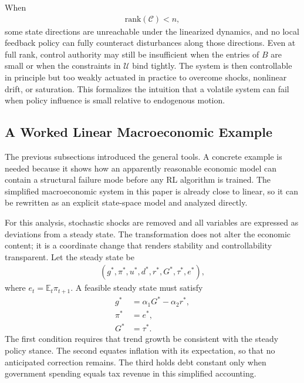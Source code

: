 \documentclass[11pt]{article}
\begin{document}
When
\begin{align}
    \mathrm{rank}(\mathcal{C}) < n,
\end{align}
some state directions are unreachable under the linearized dynamics, and no local feedback policy can fully counteract disturbances along those directions. Even at full rank, control authority may still be insufficient when the entries of $B$ are small or when the constraints in $\mathcal{U}$ bind tightly. The system is then controllable in principle but too weakly actuated in practice to overcome shocks, nonlinear drift, or saturation. This formalizes the intuition that a volatile system can fail when policy influence is small relative to endogenous motion.

\subsection{A Worked Linear Macroeconomic Example}
The previous subsections introduced the general tools. A concrete example is needed because it shows how an apparently reasonable economic model can contain a structural failure mode before any RL algorithm is trained. The simplified macroeconomic system in this paper is already close to linear, so it can be rewritten as an explicit state-space model and analyzed directly.

For this analysis, stochastic shocks are removed and all variables are expressed as deviations from a steady state. The transformation does not alter the economic content; it is a coordinate change that renders stability and controllability transparent. Let the steady state be
\begin{align*}
    (g^*,\pi^*,u^*,d^*,r^*,G^*,\tau^*,e^*),
\end{align*}
where $e_t=\mathbb{E}_t\pi_{t+1}$. A feasible steady state must satisfy
\begin{align*}
    g^* &= \alpha_1G^*-\alpha_2r^*, \\
    \pi^* &= e^*, \\
    G^* &= \tau^*.
\end{align*}
The first condition requires that trend growth be consistent with the steady policy stance. The second equates inflation with its expectation, so that no anticipated correction remains. The third holds debt constant only when government spending equals tax revenue in this simplified accounting.
\end{document}
